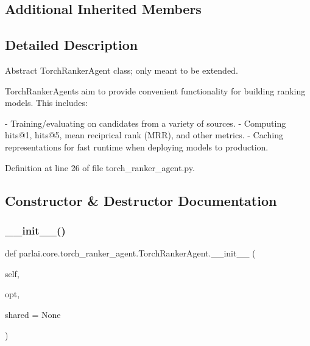 \subsection*{Additional Inherited Members}


\subsection{Detailed Description}
\begin{DoxyVerb}Abstract TorchRankerAgent class; only meant to be extended.

TorchRankerAgents aim to provide convenient functionality for building ranking
models. This includes:

- Training/evaluating on candidates from a variety of sources.
- Computing hits@1, hits@5, mean reciprical rank (MRR), and other metrics.
- Caching representations for fast runtime when deploying models to production.
\end{DoxyVerb}
 

Definition at line 26 of file torch\+\_\+ranker\+\_\+agent.\+py.



\subsection{Constructor \& Destructor Documentation}
\mbox{\label{classparlai_1_1core_1_1torch__ranker__agent_1_1TorchRankerAgent_acde404a79bf3678bb52d3e6c3ee5244a}} 
\subsubsection{\texorpdfstring{\+\_\+\+\_\+init\+\_\+\+\_\+()}{\_\_init\_\_()}}
{\footnotesize\ttfamily def parlai.\+core.\+torch\+\_\+ranker\+\_\+agent.\+Torch\+Ranker\+Agent.\+\_\+\+\_\+init\+\_\+\+\_\+ (\begin{DoxyParamCaption}\item[{}]{self,  }\item[{}]{opt,  }\item[{}]{shared = {\ttfamily None} }\end{DoxyParamCaption})}



